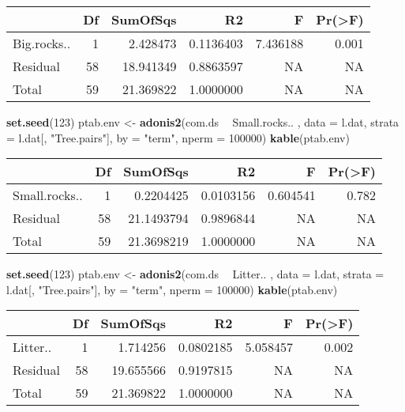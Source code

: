 \documentclass[]{article}
\newenvironment{Shaded}{\begin{snugshade}}{\end{snugshade}}
\newcommand{\KeywordTok}[1]{\textcolor[rgb]{0.13,0.29,0.53}{\textbf{#1}}}
\newcommand{\DataTypeTok}[1]{\textcolor[rgb]{0.13,0.29,0.53}{#1}}
\newcommand{\DecValTok}[1]{\textcolor[rgb]{0.00,0.00,0.81}{#1}}
\newcommand{\StringTok}[1]{\textcolor[rgb]{0.31,0.60,0.02}{#1}}
\newcommand{\OperatorTok}[1]{\textcolor[rgb]{0.81,0.36,0.00}{\textbf{#1}}}
\newcommand{\NormalTok}[1]{#1}
\begin{document}
\begin{longtable}[]{@{}lrrrrr@{}}
\toprule
& Df & SumOfSqs & R2 & F & Pr(\textgreater{}F)\tabularnewline
\midrule
\endhead
Big.rocks.. & 1 & 2.428473 & 0.1136403 & 7.436188 & 0.001\tabularnewline
Residual & 58 & 18.941349 & 0.8863597 & NA & NA\tabularnewline
Total & 59 & 21.369822 & 1.0000000 & NA & NA\tabularnewline
\bottomrule
\end{longtable}

\begin{Shaded}
\begin{Highlighting}[]
\KeywordTok{set.seed}\NormalTok{(}\DecValTok{123}\NormalTok{)}
\NormalTok{ptab.env <-}\StringTok{ }\KeywordTok{adonis2}\NormalTok{(com.ds }\OperatorTok{~}\StringTok{ }\NormalTok{Small.rocks.. , }\DataTypeTok{data =}\NormalTok{ l.dat, }
                   \DataTypeTok{strata =}\NormalTok{ l.dat[, }\StringTok{"Tree.pairs"}\NormalTok{], }
                   \DataTypeTok{by =} \StringTok{"term"}\NormalTok{, }\DataTypeTok{nperm =} \DecValTok{100000}\NormalTok{)}
\KeywordTok{kable}\NormalTok{(ptab.env)}
\end{Highlighting}
\end{Shaded}

\begin{longtable}[]{@{}lrrrrr@{}}
\toprule
& Df & SumOfSqs & R2 & F & Pr(\textgreater{}F)\tabularnewline
\midrule
\endhead
Small.rocks.. & 1 & 0.2204425 & 0.0103156 & 0.604541 &
0.782\tabularnewline
Residual & 58 & 21.1493794 & 0.9896844 & NA & NA\tabularnewline
Total & 59 & 21.3698219 & 1.0000000 & NA & NA\tabularnewline
\bottomrule
\end{longtable}

\begin{Shaded}
\begin{Highlighting}[]
\KeywordTok{set.seed}\NormalTok{(}\DecValTok{123}\NormalTok{)}
\NormalTok{ptab.env <-}\StringTok{ }\KeywordTok{adonis2}\NormalTok{(com.ds }\OperatorTok{~}\StringTok{ }\NormalTok{Litter.. , }\DataTypeTok{data =}\NormalTok{ l.dat, }
                   \DataTypeTok{strata =}\NormalTok{ l.dat[, }\StringTok{"Tree.pairs"}\NormalTok{], }
                   \DataTypeTok{by =} \StringTok{"term"}\NormalTok{, }\DataTypeTok{nperm =} \DecValTok{100000}\NormalTok{)}
\KeywordTok{kable}\NormalTok{(ptab.env)}
\end{Highlighting}
\end{Shaded}

\begin{longtable}[]{@{}lrrrrr@{}}
\toprule
& Df & SumOfSqs & R2 & F & Pr(\textgreater{}F)\tabularnewline
\midrule
\endhead
Litter.. & 1 & 1.714256 & 0.0802185 & 5.058457 & 0.002\tabularnewline
Residual & 58 & 19.655566 & 0.9197815 & NA & NA\tabularnewline
Total & 59 & 21.369822 & 1.0000000 & NA & NA\tabularnewline
\bottomrule
\end{longtable}
\end{document}
